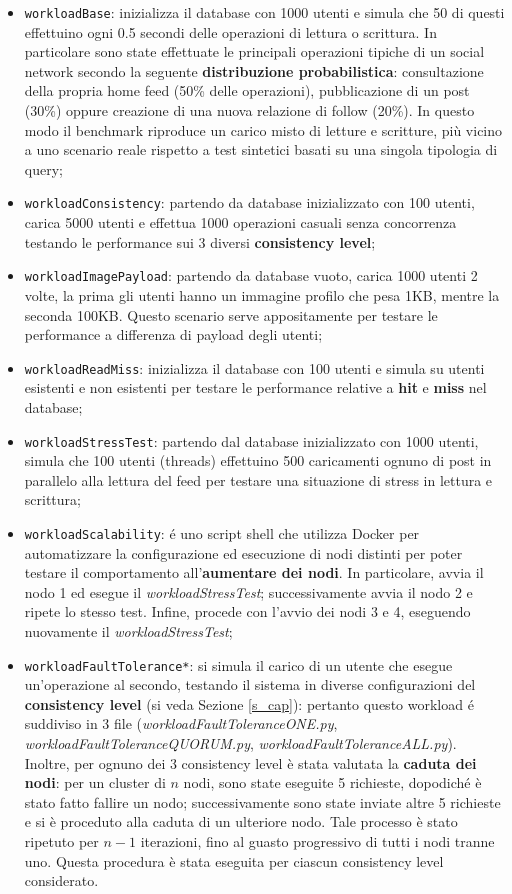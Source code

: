 \documentclass[12pt]{article}
\begin{document}
\begin{itemize}
    \item \texttt{workloadBase}: inizializza il database con 1000 utenti e simula che 50 di questi effettuino ogni 0.5 secondi delle operazioni di lettura o scrittura. In particolare sono state effettuate le principali operazioni tipiche di un social network secondo la seguente \textbf{distribuzione probabilistica}: consultazione della propria home feed (50\% delle operazioni), pubblicazione di un post (30\%) oppure creazione di una nuova relazione di follow (20\%). In questo modo il benchmark riproduce un carico misto di letture e scritture, più vicino a uno scenario reale rispetto a test sintetici basati su una singola tipologia di query;
    \item \texttt{workloadConsistency}: partendo da database inizializzato con 100 utenti, carica 5000 utenti e effettua 1000 operazioni casuali senza concorrenza testando le performance sui 3 diversi \textbf{consistency level};
    \item \texttt{workloadImagePayload}: partendo da database vuoto, carica 1000 utenti 2 volte, la prima gli utenti hanno un immagine profilo che pesa 1KB, mentre la seconda 100KB. Questo scenario serve appositamente per testare le performance a differenza di payload degli utenti;
    \item \texttt{workloadReadMiss}: inizializza il database con 100 utenti e simula su utenti esistenti e non esistenti per testare le performance relative a \textbf{hit} e \textbf{miss} nel database;
    \item \texttt{workloadStressTest}: partendo dal database inizializzato con 1000 utenti, simula che 100 utenti (threads) effettuino 500 caricamenti ognuno di post in parallelo alla lettura del feed per testare una situazione di stress in lettura e scrittura;
    \item \texttt{workloadScalability}: é uno script shell che utilizza Docker per automatizzare la configurazione ed esecuzione di nodi distinti per poter testare il comportamento all'\textbf{aumentare dei nodi}. In particolare, avvia il nodo 1 ed esegue il \textit{workloadStressTest}; successivamente avvia il nodo 2 e ripete lo stesso test. Infine, procede con l’avvio dei nodi 3 e 4, eseguendo nuovamente il \textit{workloadStressTest};
    \item \texttt{workloadFaultTolerance*}: si simula il carico di un utente che esegue un’operazione al secondo, testando il sistema in diverse configurazioni del \textbf{consistency level} (si veda Sezione \ref{s_cap}): pertanto questo workload é suddiviso in 3 file (\textit{workloadFaultToleranceONE.py}, \textit{workloadFaultToleranceQUORUM.py}, \textit{workloadFaultToleranceALL.py}). Inoltre, per ognuno dei 3 consistency level è stata valutata la \textbf{caduta dei nodi}: per un cluster di \( n \) nodi, sono state eseguite 5 richieste, dopodiché è stato fatto fallire un nodo; successivamente sono state inviate altre 5 richieste e si è proceduto alla caduta di un ulteriore nodo. Tale processo è stato ripetuto per \( n-1 \) iterazioni, fino al guasto progressivo di tutti i nodi tranne uno. Questa procedura è stata eseguita per ciascun consistency level considerato.

\end{itemize}
\end{document}
